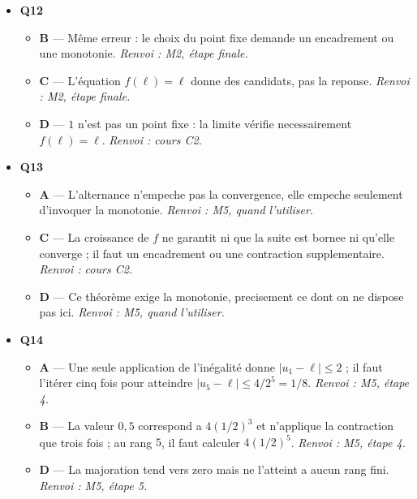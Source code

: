 \begin{itemize}
\begin{itemize}
    \item \textbf{B} — Être croissante et majorée est un comportement, pas une forme : la suite $u_n = 1 - 1/n$ est croissante et majorée sans être géométrique, aucun quotient $u_{n+1}/u_n$ n'y étant constant. \emph{Renvoi : RE-C2.}
    \item \textbf{C} — Diverger vers $+\infty$ signifie depasser tout réel, ce qui est impossible pour une suite majorée par un réel fixe. \emph{Renvoi : cours C2.}
  \end{itemize}
  \item \textbf{Q12}
  \begin{itemize}
    \item \textbf{B} — Même erreur : le choix du point fixe demande un encadrement ou une monotonie. \emph{Renvoi : M2, étape finale.}
    \item \textbf{C} — L'équation $f(\ell) = \ell$ donne des candidats, pas la reponse. \emph{Renvoi : M2, étape finale.}
    \item \textbf{D} — $1$ n'est pas un point fixe : la limite vérifie necessairement $f(\ell) = \ell$. \emph{Renvoi : cours C2.}
  \end{itemize}
  \item \textbf{Q13}
  \begin{itemize}
    \item \textbf{A} — L'alternance n'empeche pas la convergence, elle empeche seulement d'invoquer la monotonie. \emph{Renvoi : M5, quand l'utiliser.}
    \item \textbf{C} — La croissance de $f$ ne garantit ni que la suite est bornee ni qu'elle converge ; il faut un encadrement ou une contraction supplementaire. \emph{Renvoi : cours C2.}
    \item \textbf{D} — Ce théorème exige la monotonie, precisement ce dont on ne dispose pas ici. \emph{Renvoi : M5, quand l'utiliser.}
  \end{itemize}
  \item \textbf{Q14}
  \begin{itemize}
    \item \textbf{A} — Une seule application de l'inégalité donne $|u_1-\ell|\leq 2$ ; il faut l'itérer cinq fois pour atteindre $|u_5-\ell|\leq 4/2^5 = 1/8$. \emph{Renvoi : M5, étape 4.}
    \item \textbf{B} — La valeur $0{,}5$ correspond a $4(1/2)^3$ et n'applique la contraction que trois fois ; au rang $5$, il faut calculer $4(1/2)^5$. \emph{Renvoi : M5, étape 4.}
    \item \textbf{D} — La majoration tend vers zero mais ne l'atteint a aucun rang fini. \emph{Renvoi : M5, étape 5.}

\end{itemize}
\end{itemize}
